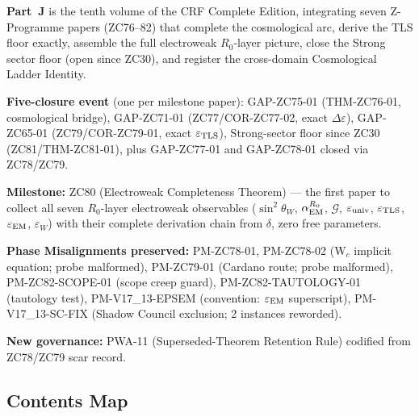 \documentclass[11pt, a4paper]{article}
\begin{document}
\begin{volumebox}[title={Part J --- CRF Complete Edition v17.13
  (Parts XLIX--LII)}]
\sloppy
\textbf{Part~J} is the tenth volume of the CRF Complete Edition,
integrating seven Z-Programme papers (ZC76--82) that complete the
cosmological arc, derive the TLS floor exactly, assemble the full
electroweak $R_0$-layer picture, close the Strong sector floor
(open since ZC30), and register the cross-domain Cosmological
Ladder Identity.

\textbf{Five-closure event} (one per milestone paper):
GAP-ZC75-01 (THM-ZC76-01, cosmological bridge),
GAP-ZC71-01 (ZC77/COR-ZC77-02, exact $\Delta\varepsilon$),
GAP-ZC65-01 (ZC79/COR-ZC79-01, exact $\varepsilon_{\rm TLS}$),
Strong-sector floor since ZC30 (ZC81/THM-ZC81-01), plus
GAP-ZC77-01 and GAP-ZC78-01 closed via ZC78/ZC79.

\textbf{Milestone:} ZC80 (Electroweak Completeness Theorem) —
the first paper to collect all seven $R_0$-layer electroweak
observables ($\sin^2\theta_W$, $\alpha_{\rm EM}^{R_0}$,
$\mathcal{G}$, $\varepsilon_{\rm univ}$, $\varepsilon_{\rm TLS}$,
$\varepsilon_{\rm EM}$, $\varepsilon_W$) with their complete
derivation chain from $\delta$, zero free parameters.

\textbf{Phase Misalignments preserved:}
PM-ZC78-01, PM-ZC78-02 (W$_c$ implicit equation; probe malformed),
PM-ZC79-01 (Cardano route; probe malformed),
PM-ZC82-SCOPE-01 (scope creep guard),
PM-ZC82-TAUTOLOGY-01 (tautology test),
PM-V17\_13-EPSEM (convention: $\varepsilon_{\rm EM}$ superscript),
PM-V17\_13-SC-FIX (Shadow Council exclusion; 2 instances reworded).

\textbf{New governance:} PWA-11 (Superseded-Theorem Retention Rule)
codified from ZC78/ZC79 scar record.
\end{volumebox}

\subsection*{Contents Map}
\end{document}
